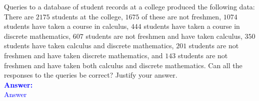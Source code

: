 \item{}
Queries to a database of student records at a college produced the following
data: There are $2175$ students at the college, $1675$ of these are not
freshmen, $1074$ students have taken a course in calculus, $444$ students have
taken a course in discrete mathematics, $607$ students are not freshmen and have
taken calculus, $350$ students have taken calculus and discrete mathematics,
$201$ students are not freshmen and have taken discrete mathematics, and $143$
students are not freshmen and have taken both calculus and discrete mathematics.
Can all the responses to the queries be correct? Justify your answer.\\[12pt]
\ifanswers
\textcolor{blue}{
\textbf{Answer:}\\[6pt]
Answer
}
\newpage
\fi
